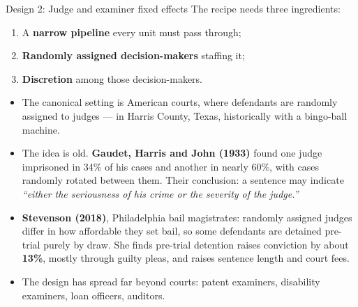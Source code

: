 \documentclass[
  11pt,
  ignorenonframetext,
  aspectratio=169,
]{beamer}
\providecommand{\tightlist}{%
  \setlength{\itemsep}{0pt}\setlength{\parskip}{0pt}}
\begin{document}
\begin{frame}{Design 2: Judge and examiner fixed effects}
\protect{}\label{design-2-judge-and-examiner-fixed-effects}
The recipe needs three ingredients:

\begin{enumerate}
\tightlist
\item
  A \textbf{narrow pipeline} every unit must pass through;
\item
  \textbf{Randomly assigned decision-makers} staffing it;
\item
  \textbf{Discretion} among those decision-makers.
\end{enumerate}

\vspace{0.4em}

\begin{itemize}
\tightlist
\item
  The canonical setting is American courts, where defendants are
  randomly assigned to judges --- in Harris County, Texas, historically
  with a bingo-ball machine.
\item
  The idea is old. \textbf{Gaudet, Harris and John (1933)} found one
  judge imprisoned in 34\% of his cases and another in nearly 60\%, with
  cases randomly rotated between them. Their conclusion: a sentence may
  indicate \emph{``either the seriousness of his crime or the severity
  of the judge.''}
\item
  \textbf{Stevenson (2018)}, Philadelphia bail magistrates: randomly
  assigned judges differ in how affordable they set bail, so some
  defendants are detained pre-trial purely by draw. She finds pre-trial
  detention raises conviction by about \textbf{13\%}, mostly through
  guilty pleas, and raises sentence length and court fees.
\item
  The design has spread far beyond courts: patent examiners, disability
  examiners, loan officers, auditors.
\end{itemize}
\end{frame}
\end{document}
